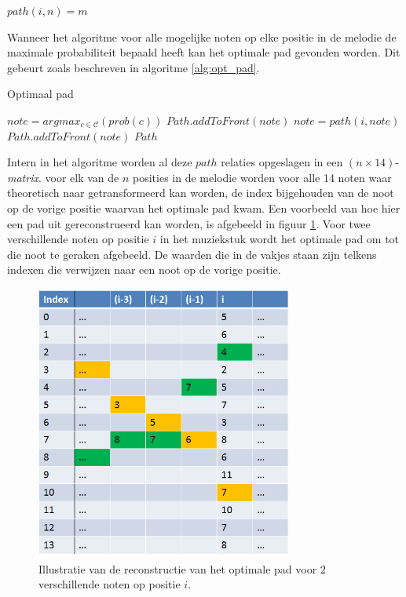 \begin{framed}
\noindent
$path(i,n)=m$
\end{framed}

Wanneer het algoritme voor alle mogelijke noten op elke positie in de melodie de maximale probabiliteit bepaald heeft kan het optimale pad gevonden worden. Dit gebeurt zoals beschreven in algoritme \ref{alg:opt_pad}.

\begin{algorithm}
\caption{Optimaal pad}\label{alg:opt_pad}
\begin{algorithmic}
\State $note=argmax_{c \in \mathcal{C}}(prob(c))$
\State $Path.addToFront(note)$
	\State $note = path(i,note)$
	\State $Path.addToFront(note)$
\EndFor
\State \Return $Path$
\end{algorithmic}
\end{algorithm}

Intern in het algoritme worden al deze $path$ relaties opgeslagen in een $(n\times 14)$-\textit{matrix}. voor elk van de $n$ posities in de melodie worden voor alle 14 noten waar theoretisch naar getransformeerd kan worden, de index bijgehouden van de noot op de vorige positie waarvan het optimale pad kwam. Een voorbeeld van hoe hier een pad uit gereconstrueerd kan worden, is afgebeeld in figuur \ref{figuur:matrix}. Voor twee verschillende noten op positie $i$ in het muziekstuk wordt het optimale pad om tot die noot te geraken afgebeeld. De waarden die in de vakjes staan zijn telkens indexen die verwijzen naar een noot op de vorige positie.

\begin{figure}[!ht]
  \centering
  \includegraphics[width=0.75\textwidth]{4_Efficient_Toepassen_Transformatie/matrix}
  \caption{Illustratie van de reconstructie van het optimale pad voor 2 verschillende noten op positie $i$.}
  \label{figuur:matrix}
\end{figure}

